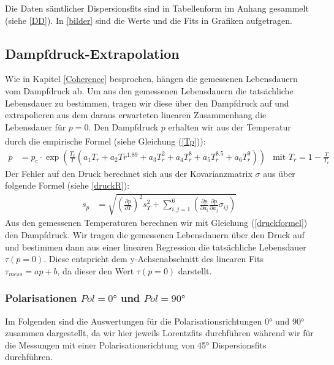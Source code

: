 \documentclass[12pt]{article}
\newcommand{\del}[2][]{\frac{\partial #1}{\partial #2}}
\begin{document}
Die Daten sämtlicher Dispersionsfits sind in Tabellenform im Anhang gesammelt (siehe \ref{DD}). In \ref{bilder} sind die Werte und die Fits in Grafiken aufgetragen.
\newpage
\subsection{Dampfdruck-Extrapolation \label{DE}}
Wie in Kapitel \ref{Coherence} besprochen, hängen die gemessenen Lebensdauern vom Dampfdruck ab. Um aus den gemessenen Lebensdauern die tatsächliche Lebensdauer zu bestimmen, tragen wir diese über den Dampfdruck auf und extrapolieren aus dem daraus erwarteten linearen Zusammenhang die Lebensdauer für $p=0$. Den Dampfdruck $p$ erhalten wir aus der Temperatur durch die empirische Formel (siehe Gleichung (\ref{Tp}))\textsuperscript{\cite{anleitung}}:
\begin{align}
	p&=p_c\cdot\exp\left(\frac{T_c}{T}\left(a_1T_r+a_2Tr^{1.89}+a_3T_r^2+a_4T_r^8+a_5T_r^8.5+a_6T_r^9\right)\right) &\text{mit }T_r=1-\frac{T}{T_c}\label{druckformel}
\end{align}
Der Fehler auf den Druck berechnet sich aus der Kovarianzmatrix $\sigma$ aus \cite{anleitung} über folgende Formel (siehe \ref{druckR}):
\begin{align}
	s_p&=\sqrt{\left(\del[p]{T}\right)^2s_T^2 + \sum_{i,j=1}^6\left(\del[p]{a_i}\del[p]{a_j}\sigma_{ij}\right)}
\end{align}
Aus den gemessenen Temperaturen berechnen wir mit Gleichung (\ref{druckformel}) den Dampfdruck. Wir tragen die gemessenen Lebensdauern über den Druck auf und bestimmen dann aus einer linearen Regression die tatsächliche Lebensdauer $\tau(p=0)$. Diese entspricht dem y-Achsenabschnitt des linearen Fits $\tau_{mess}=ap+b$, da dieser den Wert $\tau(p=0)$ darstellt.
\newpage
\subsubsection{Polarisationen $Pol=0°$ und $Pol=90°$}

Im Folgenden sind die Auswertungen für die Polarisationsrichtungen 0° und 90° zusammen dargestellt, da wir hier jeweils Lorentzfits durchführen während wir für die Messungen mit einer Polarisationsrichtung von 45° Dispersionsfits durchführen.
\end{document}
